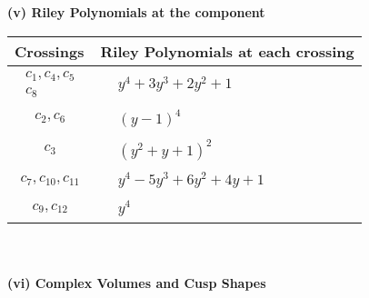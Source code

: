 \documentclass[1p]{elsarticle_modified}
\theoremstyle{definition}
\begin{document}
\newpage\renewcommand{\arraystretch}{1}
\flushleft \textbf{(v) Riley Polynomials at the component}\newline \\
\begin{tabular}{m{50pt}|m{274pt}}
Crossings & \hspace{64pt}Riley Polynomials at each crossing \\
\hline $$\begin{aligned}c_{1},c_{4},c_{5}\\c_{8}\end{aligned}$$&$\begin{aligned}
&y^4+3 y^3+2 y^2+1
\end{aligned}$\\
\hline $$\begin{aligned}c_{2},c_{6}\end{aligned}$$&$\begin{aligned}
&(y-1)^4
\end{aligned}$\\
\hline $$\begin{aligned}c_{3}\end{aligned}$$&$\begin{aligned}
&(y^2+y+1)^2
\end{aligned}$\\
\hline $$\begin{aligned}c_{7},c_{10},c_{11}\end{aligned}$$&$\begin{aligned}
&y^4-5 y^3+6 y^2+4 y+1
\end{aligned}$\\
\hline $$\begin{aligned}c_{9},c_{12}\end{aligned}$$&$\begin{aligned}
&y^4
\end{aligned}$\\
\hline
\end{tabular}\\~\\
\newpage\flushleft \textbf{(vi) Complex Volumes and Cusp Shapes}
\end{document}
